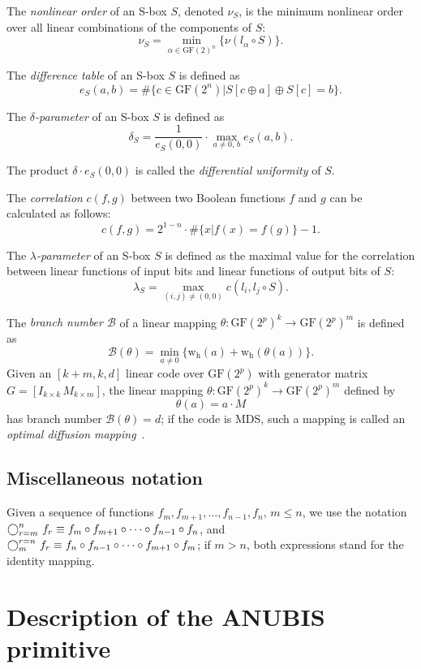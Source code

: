 \documentclass{llncs}
\newcommand{\GF}{\mathrm{GF}}
\newcommand{\compository}{\mathop{\bigcirc}\displaylimits}
\newcommand{\B}{\mathcal{B}}
\newcommand{\w}{\mathrm{w_h}}
\begin{document}
The \emph{nonlinear order} of an S-box $S$, denoted $\nu_S$, is
the minimum nonlinear order over all linear combinations of the
components of $S$:
\[
\nu_S = \min_{\alpha \in \GF(2)^n}\{\nu(l_{\alpha} \circ S)\}.
\]

The \emph{difference table} of an S-box $S$ is defined as
\[
e_S(a, b) = \#\{c \in \GF(2^n) | S[c \oplus a] \oplus S[c] = b\}.
\]

The \emph{$\delta$-parameter} of an S-box $S$ is defined as
\[
\delta_S = \dfrac{1}{e_S(0,0)} \cdot \max_{a \neq 0, \, b}{e_S(a,
b)}.
\]

The product $\delta \cdot e_S(0,0)$ is called the
\emph{differential uniformity} of $S$.

The \emph{correlation} $c(f, g)$ between two Boolean functions $f$
and $g$ can be calculated as follows:
\[
c(f,g) = 2^{1-n} \cdot \#\{x | f(x) = f(g)\} - 1.
\]

The \emph{$\lambda$-parameter} of an S-box $S$ is defined as the
maximal value for the correlation between linear functions of
input bits and linear functions of output bits of $S$:
\[
\lambda_S = \max_{(i,j) \neq (0,0)} c(l_i, l_j \circ S).
\]

The \emph{branch number $\B$} of a linear mapping $\theta:
\GF(2^p)^k \rightarrow \GF(2^p)^m$ is defined as
\[
\B(\theta) = \min_{a \neq 0}\{\w(a) + \w(\theta(a))\}.
\]
Given an $[k + m, k, d]$ linear code over $\GF(2^p)$ with
generator matrix $G = [I_{k \times k} \, M_{k \times m}]$, the
linear mapping $\theta: \GF(2^p)^k \rightarrow \GF(2^p)^m$
defined by
\[
\theta(a) = a \cdot M
\]
has branch number $\B(\theta) = d$; if the code is MDS, such a
mapping is called an \emph{optimal diffusion
mapping}~\cite{vincent}.

\subsection{Miscellaneous notation}

Given a sequence of functions $f_m, f_{m+1}, \dots, f_{n-1}, f_n,
\, m \leqslant n$, we use the notation
$\compository_{r=m}^n{\,f_r} \equiv f_m \circ f_{m+1} \circ \dots
\circ f_{n-1} \circ f_n$, and $\compository^{r=n}_m{\,f_r} \equiv
f_n \circ f_{n-1} \circ \dots \circ f_{m+1} \circ f_m$; if $m >
n$, both expressions stand for the identity mapping.

\section{Description of the {A\normalsize NUBIS}
primitive}\label{description}
\end{document}
